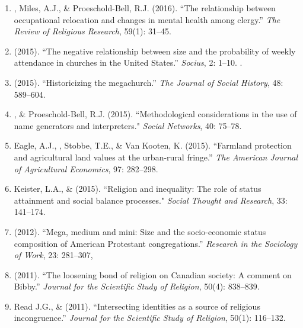 \begin{enumerate}
\item \Eagle, Miles, A.J., \& Proeschold-Bell, R.J. (2016). ``The relationship between occupational relocation and changes in mental health among clergy.'' \emph{The Review of Religious Research}, 59(1): 31--45. 

\item \Eagle \hspace{.01em} (2015). ``The negative relationship between size and the probability of weekly attendance in churches in the United States.'' \emph{Socius}, 2: 1--10.  .

\item \Eagle \hspace{.01em} (2015). ``Historicizing the megachurch.'' \textit{The Journal of Social History}, 48: 589--604. 

\item \Eagle, \& Proeschold-Bell, R.J. (2015). ``Methodological considerations in the use of name generators and interpreters." \emph{Social Networks}, 40: 75--78. 

\item Eagle, A.J., \Eagle, Stobbe, T.E., \& Van Kooten, K. (2015). ``Farmland protection and agricultural land values at the urban-rural fringe.'' \emph{The American Journal of Agricultural Economics}, 97: 282--298. 

\item Keister, L.A., \& \Eagle \hspace{.01em} (2015). ``Religion and inequality: The role of status attainment and social balance processes." \emph{Social Thought and Research}, 33: 141--174.

\item \Eagle \hspace{.01em} (2012). ``Mega, medium and mini: Size and the socio-economic status composition of American Protestant congregations.'' \emph{Research in the Sociology of Work}, 23:  281--307, 

\item \Eagle \hspace{.01em} (2011). ``The loosening bond of religion on Canadian society: A comment on Bibby.'' \emph{Journal for the Scientific Study of Religion}, 50(4): 838--839.

\item Read J.G., \& \Eagle \hspace{.01em} (2011). ``Intersecting identities as a source of religious incongruence.''  \emph{Journal for the Scientific Study of Religion}, 50(1): 116--132. 


\end{enumerate}
